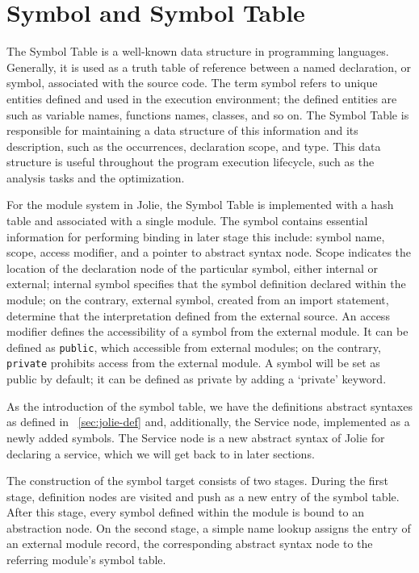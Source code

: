
\section{Symbol and Symbol Table}

The Symbol Table is a well-known data structure in programming languages. Generally, it is used as a truth table of reference between a named declaration, or symbol, associated with the source code. The term symbol refers to unique entities defined and used in the execution environment; the defined entities are such as variable names, functions names, classes, and so on.
The Symbol Table is responsible for maintaining a data structure of this information and its description, such as the occurrences, declaration scope, and type. This data structure is useful throughout the program execution lifecycle, such as the analysis tasks and the optimization.

For the module system in Jolie, the Symbol Table is implemented with a hash table and associated with a single module.
The symbol contains essential information for performing binding in later stage this include: symbol name, scope, access modifier, and a pointer to abstract syntax node.
Scope indicates the location of the declaration node of the particular symbol, either internal or external; internal symbol specifies that the symbol definition declared within the module; on the contrary, external symbol, created from an import statement, determine that the interpretation defined from the external source.
An access modifier defines the accessibility of a symbol from the external module. It can be defined as \texttt{public}, which accessible from external modules; on the contrary, \texttt{private} prohibits access from the external module. A symbol will be set as public by default; it can be defined as private by adding a `private' keyword.

As the introduction of the symbol table, we have the definitions abstract syntaxes as defined in ~\ref{sec:jolie-def} and, additionally, the Service node, implemented as a newly added symbols. The Service node is a new abstract syntax of Jolie for declaring a service, which we will get back to in later sections.

The construction of the symbol target consists of two stages. During the first stage, definition nodes are visited and push as a new entry of the symbol table. After this stage, every symbol defined within the module is bound to an abstraction node. On the second stage, a simple name lookup assigns the entry of an external module record, the corresponding abstract syntax node to the referring module's symbol table.

